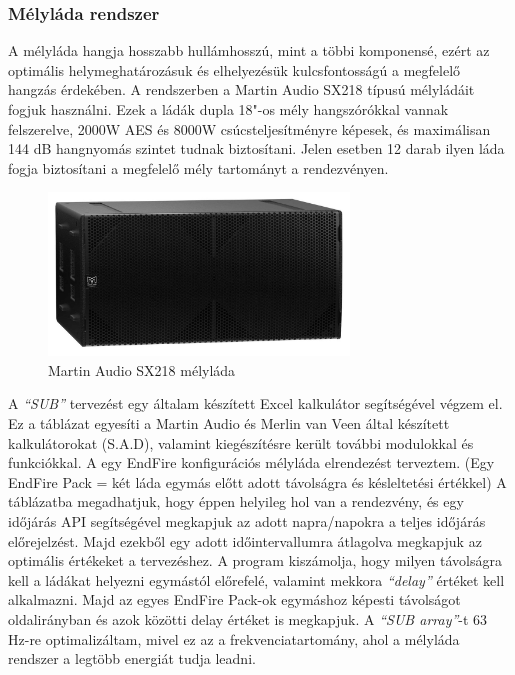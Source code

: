 \subsubsection{Mélyláda rendszer}
A mélyláda hangja hosszabb hullámhosszú, mint a többi komponensé, ezért az
optimális helymeghatározásuk és elhelyezésük kulcsfontosságú a megfelelő
hangzás érdekében. 
A rendszerben a Martin Audio SX218 típusú mélyládáit fogjuk használni.
Ezek a ládák dupla 18"-os mély hangszórókkal vannak felszerelve, 2000W AES és 8000W csúcsteljesítményre képesek, és
maximálisan 144 dB hangnyomás szintet tudnak biztosítani. \cite{SXSUBWOOFERUSERGUIDE}
Jelen esetben 12 darab ilyen láda fogja biztosítani a megfelelő mély tartományt a rendezvényen.
\begin{figure}[H]
	\centering
	\includegraphics[width=80mm, keepaspectratio]{figures/sx218_front_view.jpg}
	\caption{Martin Audio SX218 mélyláda}\label{fig:sx218}
\end{figure}
A \textit{``SUB''} tervezést egy általam készített Excel kalkulátor
segítségével végzem el. Ez a táblázat egyesíti a Martin Audio és Merlin van Veen által
készített kalkulátorokat (S.A.D), valamint kiegészítésre került további modulokkal és funkciókkal. \cite{MERLINVANVEEN} \cite{MARTINSUBCALCULATOR}
A egy EndFire konfigurációs mélyláda elrendezést terveztem. 
(Egy EndFire Pack = két láda egymás előtt adott távolságra és késleltetési értékkel) 
A táblázatba megadhatjuk, hogy éppen helyileg hol
van a rendezvény, és egy időjárás API segítségével megkapjuk az adott napra/napokra a
teljes időjárás előrejelzést. Majd ezekből egy adott időintervallumra átlagolva
megkapjuk az optimális értékeket a tervezéshez. 
A program kiszámolja, hogy milyen távolságra kell a ládákat helyezni egymástól előrefelé,
valamint mekkora \textit{``delay''} értéket kell alkalmazni. 
Majd az egyes EndFire Pack-ok egymáshoz képesti távolságot oldalirányban és azok
közötti delay értéket is megkapjuk. A \textit{``SUB array''}-t 63 Hz-re optimalizáltam, mivel
ez az a frekvenciatartomány, ahol a mélyláda rendszer a legtöbb energiát tudja leadni.
